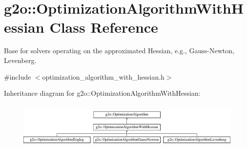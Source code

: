 \hypertarget{classg2o_1_1_optimization_algorithm_with_hessian}{}\section{g2o\+:\+:Optimization\+Algorithm\+With\+Hessian Class Reference}
\label{classg2o_1_1_optimization_algorithm_with_hessian}


Base for solvers operating on the approximated Hessian, e.\+g., Gauss-\/\+Newton, Levenberg.  




{\ttfamily \#include $<$optimization\+\_\+algorithm\+\_\+with\+\_\+hessian.\+h$>$}

Inheritance diagram for g2o\+:\+:Optimization\+Algorithm\+With\+Hessian\+:\begin{figure}[H]
\begin{center}
\leavevmode
\includegraphics[height=2.285714cm]{classg2o_1_1_optimization_algorithm_with_hessian}
\end{center}
\end{figure}
